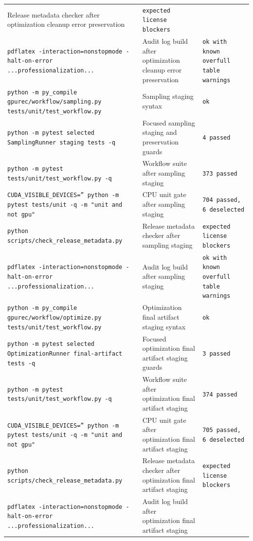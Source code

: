 \documentclass[11pt]{article}
\begin{document}
\begin{center}
\begin{tabular}{lll}
Release metadata checker after optimization cleanup error preservation &
\texttt{expected license blockers} \\
\texttt{pdflatex -interaction=nonstopmode -halt-on-error ...professionalization...} &
Audit log build after optimization cleanup error preservation &
\texttt{ok with known overfull table warnings} \\
\texttt{python -m py\_compile gpurec/workflow/sampling.py tests/unit/test\_workflow.py} &
Sampling staging syntax &
\texttt{ok} \\
\texttt{python -m pytest selected SamplingRunner staging tests -q} &
Focused sampling staging and preservation guards &
\texttt{4 passed} \\
\texttt{python -m pytest tests/unit/test\_workflow.py -q} &
Workflow suite after sampling staging &
\texttt{373 passed} \\
\texttt{CUDA\_VISIBLE\_DEVICES='' python -m pytest tests/unit -q -m "unit and not gpu"} &
CPU unit gate after sampling staging &
\texttt{704 passed, 6 deselected} \\
\texttt{python scripts/check\_release\_metadata.py} &
Release metadata checker after sampling staging &
\texttt{expected license blockers} \\
\texttt{pdflatex -interaction=nonstopmode -halt-on-error ...professionalization...} &
Audit log build after sampling staging &
\texttt{ok with known overfull table warnings} \\
\texttt{python -m py\_compile gpurec/workflow/optimize.py tests/unit/test\_workflow.py} &
Optimization final artifact staging syntax &
\texttt{ok} \\
\texttt{python -m pytest selected OptimizationRunner final-artifact tests -q} &
Focused optimization final artifact staging guards &
\texttt{3 passed} \\
\texttt{python -m pytest tests/unit/test\_workflow.py -q} &
Workflow suite after optimization final artifact staging &
\texttt{374 passed} \\
\texttt{CUDA\_VISIBLE\_DEVICES='' python -m pytest tests/unit -q -m "unit and not gpu"} &
CPU unit gate after optimization final artifact staging &
\texttt{705 passed, 6 deselected} \\
\texttt{python scripts/check\_release\_metadata.py} &
Release metadata checker after optimization final artifact staging &
\texttt{expected license blockers} \\
\texttt{pdflatex -interaction=nonstopmode -halt-on-error ...professionalization...} &
Audit log build after optimization final artifact staging &

\end{tabular}
\end{center}
\end{document}
